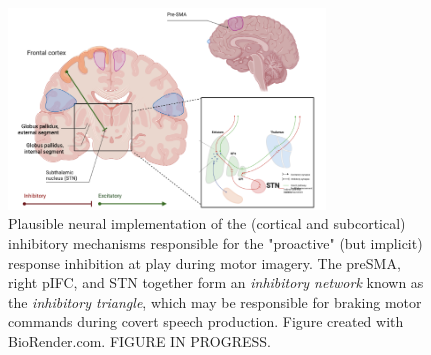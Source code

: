 \documentclass[utf8]{template/frontiersSCNS} %
\begin{document}
\begin{figure}[ht] %
\begin{center}
\includegraphics[width=0.75\textwidth]{figures/inhibitory_triangle.png} %
\end{center}
\caption{Plausible neural implementation of the (cortical and subcortical) inhibitory mechanisms responsible for the "proactive" (but implicit) response inhibition at play during motor imagery. The preSMA, right pIFC, and STN together form an \textit{inhibitory network} known as the \textit{inhibitory triangle}, which may be responsible for braking motor commands during covert speech production. Figure created with BioRender.com. FIGURE IN PROGRESS.}\label{fig:2}
\end{figure}

\end{document}
